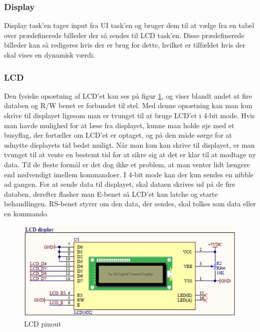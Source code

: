 \subsubsection{Display}

Display task'en tager input fra UI task'en og bruger dem til at vælge fra en tabel over prædefinerede billeder der så sendes til LCD task'en. Disse prædefinerede billeder kan så redigeres hvis der er brug for dette, hvilket er tilfældet hvis der skal vises en dynamisk værdi.

\subsubsection{LCD}

Den fysiske opsætning af LCD'et kan ses på figur \ref{fig:LCD}, og viser blandt andet at fire databen og R/W benet er forbundet til stel. Med denne opsætning kan man kun skrive til displayet ligesom man er tvunget til at bruge LCD'et i 4-bit mode. Hvis man havde mulighed for at læse fra displayet, kunne man holde øje med et busyflag, der fortæller om LCD'et er optaget, og på den måde sørge for at udnytte displayets tid bedst muligt. Når man kun kan skrive til displayet, er man tvunget til at vente en bestemt tid for at sikre sig at det er klar til at modtage ny data. Til de fleste formål er det dog ikke et problem, at man venter lidt længere end nødvendigt imellem kommandoer. I 4-bit mode kan der kun sendes en nibble ad gangen. For at sende data til displayet, skal dataen skrives ud på de fire databen, derefter flasher man E-benet så LCD'et kan latche og starte behandlingen. RS-benet styrer om den data, der sendes, skal tolkes som data eller en kommando. 

\begin{figure}[ht]
			\begin{center}
			\includegraphics[scale=0.9]{Billeder/LCD.PNG}
			\end{center}
			\caption{LCD pinout}
			\label{fig:LCD}
\end{figure}


